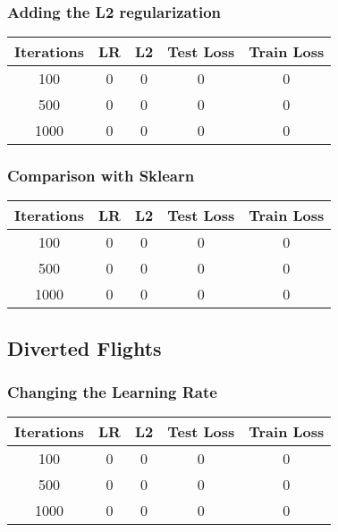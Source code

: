 \documentclass[
	letterpaper, %
	10pt, %
]{class}
\begin{document}
\subsubsection{Adding the L2 regularization}

\begin{center}
	\begin{tabular}{ |c|c|c|c|c| }
		\hline
		Iterations & LR & L2 & Test Loss & Train Loss \\
		\hline
		100        & 0  & 0  & 0         & 0          \\
		500        & 0  & 0  & 0         & 0          \\
		1000       & 0  & 0  & 0         & 0          \\
		\hline
	\end{tabular}
\end{center}

\subsubsection{Comparison with Sklearn}

\begin{center}
	\begin{tabular}{ |c|c|c|c|c| }
		\hline
		Iterations & LR & L2 & Test Loss & Train Loss \\
		\hline
		100        & 0  & 0  & 0         & 0          \\
		500        & 0  & 0  & 0         & 0          \\
		1000       & 0  & 0  & 0         & 0          \\
		\hline
	\end{tabular}
\end{center}

\subsection{Diverted Flights}

\subsubsection{Changing the Learning Rate}

\begin{center}
	\begin{tabular}{ |c|c|c|c|c| }
		\hline
		Iterations & LR & L2 & Test Loss & Train Loss \\
		\hline
		100        & 0  & 0  & 0         & 0          \\
		500        & 0  & 0  & 0         & 0          \\
		1000       & 0  & 0  & 0         & 0          \\
		\hline
	\end{tabular}
\end{center}
\end{document}
